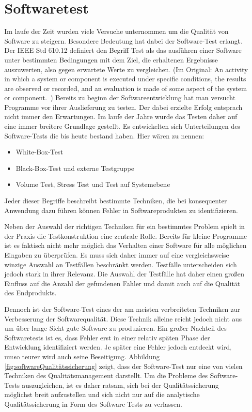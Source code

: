 \section{Softwaretest}
\label{sec:softwaretest}
Im laufe der Zeit wurden viele Versuche unternommen um die Qualität von Software zu steigern. Besondere Bedeutung hat dabei der Software-Test erlangt.
Der IEEE Std 610.12 definiert den Begriff Test als das ausführen einer Software unter bestimmten Bedingungen mit dem Ziel, die erhaltenen Ergebnisse auszuwerten, also gegen erwartete Werte zu vergleichen.
(Im Original: \glqq An activity in which a system or component is executed under specific conditions, the results are observed or recorded, and an evaluation is made of some aspect of the system or component.\grqq\ \cite{ieee_ieee_1991})
Bereits zu beginn der Softwareentwicklung hat man versucht Programme vor ihrer Auslieferung zu testen. Der dabei erzielte Erfolg entsprach nicht immer den Erwartungen. Im laufe der Jahre wurde das Testen daher auf eine immer breitere Grundlage gestellt. Es entwickelten sich Unterteilungen des Software-Tests die bis heute bestand haben. Hier wären zu nennen:
\begin{itemize}
\item White-Box-Test
\item Black-Box-Test und externe Testgruppe
\item Volume Test, Stress Test und Test auf Systemebene
\end{itemize}
Jeder dieser Begriffe beschreibt bestimmte Techniken, die bei konsequenter Anwendung dazu führen können Fehler in Softwareprodukten zu identifizieren. \cite[vgl. Seite 18]{thaller_software-test_2002}

Neben der Auswahl der richtigen Techniken für ein bestimmtes Problem spielt in der Praxis die Testkonstruktion eine zentrale Rolle. Bereits für kleine Programme ist es faktisch nicht mehr möglich das Verhalten einer Software für alle möglichen Eingaben zu überprüfen. Es muss sich daher immer auf eine vergleichsweise winzige Auswahl an Testfällen beschränkt werden. Testfälle unterscheiden sich jedoch stark in ihrer Relevanz. Die Auswahl der Testfälle hat daher einen großen Einfluss auf die Anzahl der gefundenen Fahler und damit auch auf die Qualität des Endprodukts. \cite[vgl. Seite 22]{hoffmann_software-qualitat_2013}

Dennoch ist der Software-Test eines der am meisten verbreiteten Techniken zur Verbesserung der Softwarequalität. Diese Technik alleine reicht jedoch nicht aus um über lange Sicht gute Software zu produzieren. Ein großer Nachteil des Softwaretests ist es, dass Fehler erst in einer relativ späten Phase der Entwicklung identifiziert werden. Je später eine Fehler jedoch entdeckt wird, umso teurer wird auch seine Beseitigung. Abbildung \ref{fig:softwareQualitätssicherung} zeigt, dass der Software-Test nur eine von vielen Techniken des Qualitätsmanagement darstellt. Um die Probleme des Software-Tests auszugleichen, ist es daher ratsam, sich bei der Qualitätssicherung möglichst breit aufzustellen und sich nicht nur auf die analytische Qualitätssicherung in Form des Software-Tests zu verlassen. \cite[vgl. Seite 18]{thaller_software-test_2002}


